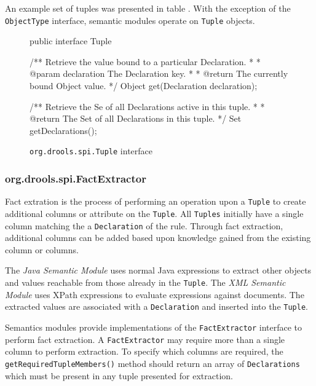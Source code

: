 An example set of tuples was presented in table
. With the exception of the \verb|ObjectType|
interface, semantic modules operate on \verb|Tuple| objects. 

\begin{figure}
\begin{codelisting}
public interface Tuple
{
    /** Retrieve the value bound to a particular Declaration.
     *
     *  @param declaration The Declaration key.
     *
     *  @return The currently bound Object value.
     */
    Object get(Declaration declaration);

    /** Retrieve the Se of all Declarations active in this tuple.
     *
     *  @return The Set of all Declarations in this tuple.
     */
    Set getDeclarations();
}
\end{codelisting}
\label{code.Tuple}
\caption{\texttt{org.drools.spi.Tuple} interface}
\end{figure}

\subsubsection{org.drools.spi.FactExtractor}

Fact extration is the process of performing an operation upon a
\verb|Tuple| to create additional columns or attribute on the
\verb|Tuple|.  All \verb|Tuples| initially have a single column
matching the a \verb|Declaration| of the rule.  Through fact
extraction, additional columns can be added based upon knowledge
gained from the existing column or columns.

The \emph{Java Semantic Module} uses normal Java expressions to
extract other objects and values reachable from those already in the
\verb|Tuple|.  The \emph{XML Semantic Module} uses XPath expressions
to evaluate expressions against documents.  The extracted values are
associated with a \verb|Declaration| and inserted into the
\verb|Tuple|.

Semantics modules provide implementations of the \verb|FactExtractor|
interface to perform fact extraction. A \verb|FactExtractor| may
require more than a single column to perform extraction.  To specify
which columns are required, the \verb|getRequiredTupleMembers()| 
method should return an array of \verb|Declarations| which must 
be present in any tuple presented for extraction.

